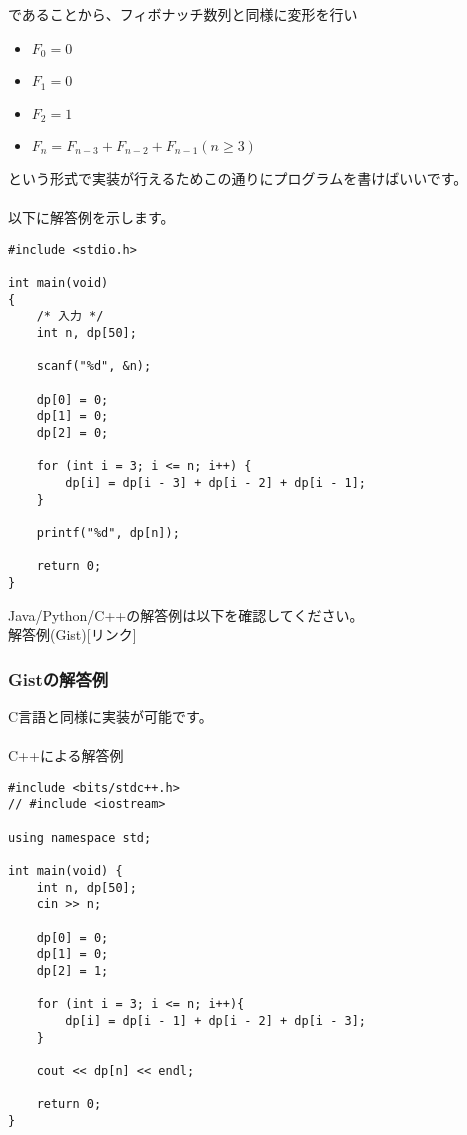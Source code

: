 であることから、フィボナッチ数列と同様に変形を行い

\begin{itemize}
    \item $F_0 = 0$
    \item $F_1 = 0$
    \item $F_2 = 1$
    \item $F_{n} = F_{n - 3} + F_{n-2}+ F_{n-1}(n \geq 3)$
\end{itemize}

\noindent
という形式で実装が行えるためこの通りにプログラムを書けばいいです。
\\ \\ \noindent
以下に解答例を示します。

\noindent
\begin{lstlisting}[style = customC]
#include <stdio.h>

int main(void) 
{
    /* 入力 */
    int n, dp[50];

    scanf("%d", &n);

    dp[0] = 0;
    dp[1] = 0;
    dp[2] = 0;

    for (int i = 3; i <= n; i++) {
        dp[i] = dp[i - 3] + dp[i - 2] + dp[i - 1];
    }

    printf("%d", dp[n]);

    return 0;
}
\end{lstlisting}

\noindent
Java/Python/C++の解答例は以下を確認してください。\\
解答例(Gist)[リンク]

\clearpage

\subsubsection{Gistの解答例}
\noindent
C言語と同様に実装が可能です。
\\ \\
\noindent
C++による解答例
\begin{lstlisting}[style = customCpp]
#include <bits/stdc++.h>
// #include <iostream>

using namespace std;

int main(void) {
    int n, dp[50];
    cin >> n;

    dp[0] = 0;
    dp[1] = 0;
    dp[2] = 1;

    for (int i = 3; i <= n; i++){
        dp[i] = dp[i - 1] + dp[i - 2] + dp[i - 3];
    }

    cout << dp[n] << endl;
    
    return 0;
}
\end{lstlisting}


